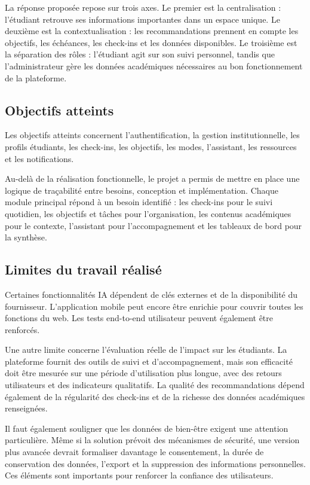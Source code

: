 \documentclass{rapportENSET}
\begin{document}
La réponse proposée repose sur trois axes. Le premier est la centralisation : l'étudiant retrouve ses informations importantes dans un espace unique. Le deuxième est la contextualisation : les recommandations prennent en compte les objectifs, les échéances, les check-ins et les données disponibles. Le troisième est la séparation des rôles : l'étudiant agit sur son suivi personnel, tandis que l'administrateur gère les données académiques nécessaires au bon fonctionnement de la plateforme.

\subsection*{Objectifs atteints}
Les objectifs atteints concernent l'authentification, la gestion institutionnelle, les profils étudiants, les check-ins, les objectifs, les modes, l'assistant, les ressources et les notifications.

Au-delà de la réalisation fonctionnelle, le projet a permis de mettre en place une logique de traçabilité entre besoins, conception et implémentation. Chaque module principal répond à un besoin identifié : les check-ins pour le suivi quotidien, les objectifs et tâches pour l'organisation, les contenus académiques pour le contexte, l'assistant pour l'accompagnement et les tableaux de bord pour la synthèse.

\subsection*{Limites du travail réalisé}
Certaines fonctionnalités IA dépendent de clés externes et de la disponibilité du fournisseur. L'application mobile peut encore être enrichie pour couvrir toutes les fonctions du web. Les tests end-to-end utilisateur peuvent également être renforcés.

Une autre limite concerne l'évaluation réelle de l'impact sur les étudiants. La plateforme fournit des outils de suivi et d'accompagnement, mais son efficacité doit être mesurée sur une période d'utilisation plus longue, avec des retours utilisateurs et des indicateurs qualitatifs. La qualité des recommandations dépend également de la régularité des check-ins et de la richesse des données académiques renseignées.

Il faut également souligner que les données de bien-être exigent une attention particulière. Même si la solution prévoit des mécanismes de sécurité, une version plus avancée devrait formaliser davantage le consentement, la durée de conservation des données, l'export et la suppression des informations personnelles. Ces éléments sont importants pour renforcer la confiance des utilisateurs.
\end{document}
